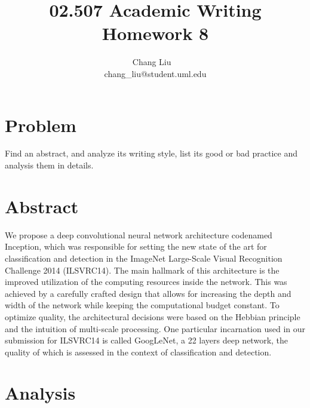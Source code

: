 \documentclass{article}
\title{02.507 Academic Writing Homework 8}
\author{Chang Liu ~\\ chang\_liu@student.uml.edu}
\begin{document}
\maketitle

\section{Problem}

Find an abstract, and analyze its writing style, list its good or bad practice and analysis them in details.

\section{Abstract}
We propose a deep convolutional neural network architecture codenamed Inception,
which was responsible for setting the new state of the art for classification
and detection in the ImageNet Large-Scale Visual Recognition Challenge 2014
(ILSVRC14). The main hallmark of this architecture is the improved utilization
of the computing resources inside the network. This was achieved by a carefully
crafted design that allows for increasing the depth and width of the network while
keeping the computational budget constant. To optimize quality, the architectural
decisions were based on the Hebbian principle and the intuition of multi-scale
processing. One particular incarnation used in our submission for ILSVRC14 is
called GoogLeNet, a 22 layers deep network, the quality of which is assessed in
the context of classification and detection.


\section{Analysis}
\end{document}
